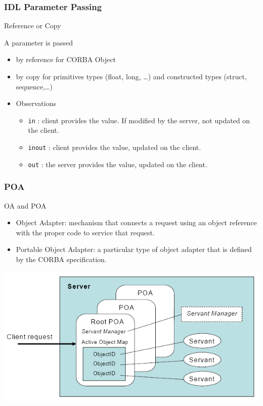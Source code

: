 \documentclass[bigger,hyperref={colorlinks=true, urlcolor=red, plainpages=false, pdfpagelabels, bookmarksnumbered}]{beamer}
\begin{document}
\begin{frame}
\frametitle{IDL Parameter Passing}
\label{sec-4-9}
\begin{block}{Reference or Copy}
\label{sec-4-9-1}



    A parameter is passed
\begin{itemize}
\item by reference for CORBA Object
\item by copy for primitives types (float, long, \ldots{}) and constructed types (struct, sequence,\ldots{})
\end{itemize}
\end{block}
\begin{itemize}

\item Observations
\label{sec-4-9-2}%
\begin{itemize}
\item \texttt{in} : client provides the value. If modified by the server, not updated on the client.
\item \texttt{inout} :  client provides the value, updated on the client.
\item \texttt{out} : the server provides the value, updated on the client.
\end{itemize}

\end{itemize} %
\end{frame}
\begin{frame}
\frametitle{POA}
\label{sec-4-10}
\begin{block}{OA and POA}
\label{sec-4-10-1}

\begin{itemize}
\item Object Adapter: 
  mechanism that connects a request using an object reference with the proper code to service that request.
\item Portable Object Adapter: a particular type of object adapter that is 
  defined by the CORBA specification.
\end{itemize}

\includegraphics[width=.9\linewidth]{./img/POA.png}
\end{block}
\end{frame}
\end{document}
